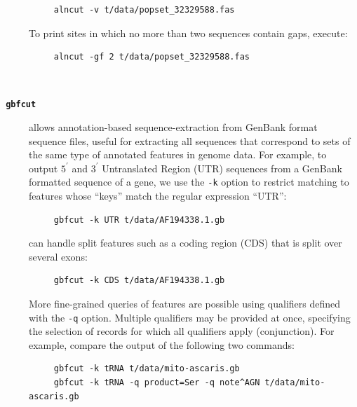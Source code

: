 \documentclass{frontiersSCNS} %
\newcommand{\tp}{$3^\prime${ }}
\newcommand{\fp}{$5^\prime${ }}
\begin{document}
\begin{description}
\begin{verbatim}
     alncut -v t/data/popset_32329588.fas
\end{verbatim}
\noindent To print sites in which no more than two sequences contain
gaps, execute: 

\begin{verbatim}
     alncut -gf 2 t/data/popset_32329588.fas
\end{verbatim}
\\
\item[\texttt{\textbf{ gbfcut}} ] allows annotation-based
  sequence-extraction from GenBank format sequence files, useful for
  extracting all sequences that correspond to sets of the same type of
  annotated features in genome data. For example, to output \fp and
  \tp Untranslated Region (UTR) sequences from a GenBank formatted
  sequence of a gene, we use the \verb|-k| option to restrict matching
  to features whose ``keys'' match the regular expression ``UTR'':

\begin{verbatim}
     gbfcut -k UTR t/data/AF194338.1.gb
\end{verbatim}

 can handle split features such as a coding region (CDS)
that is split over several exons:

\begin{verbatim}
     gbfcut -k CDS t/data/AF194338.1.gb
\end{verbatim}

\noindent More fine-grained queries of features are possible using
qualifiers defined with the \verb|-q| option. Multiple qualifiers may
be provided at once, specifying the selection of records for which all
qualifiers apply (conjunction).  For example, compare the output of
the following two commands:

\begin{verbatim}
     gbfcut -k tRNA t/data/mito-ascaris.gb
     gbfcut -k tRNA -q product=Ser -q note^AGN t/data/mito-ascaris.gb
\end{verbatim}


\end{description}
\end{document}
